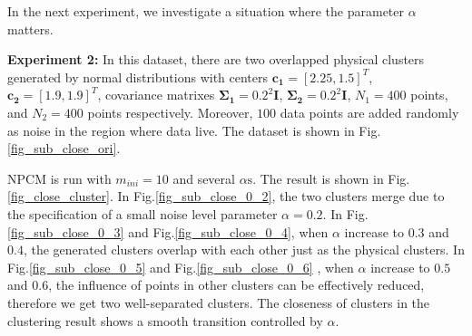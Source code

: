 \documentclass[conference]{IEEEtran}
\theoremstyle{definition}
\begin{document}
In the next experiment, we investigate a situation where the parameter $\alpha$ matters.

\textbf{Experiment 2:} In this dataset, there are two overlapped physical clusters generated by normal distributions with centers $\mathbf{c_1}=[2.25, 1.5]^T$, $\mathbf{c_2}=[1.9, 1.9]^T$, covariance matrixes $\mathbf{\Sigma_1}=0.2^2\mathbf{I}$, $\mathbf{\Sigma_2}=0.2^2\mathbf{I}$, $N_1=400$ points, and $N_2=400$ points respectively.  Moreover, $100$ data points are added randomly as noise in the region where data live. The dataset is shown in Fig.\ref{fig_sub_close_ori}.

NPCM is run with $m_{ini}=10$ and several $\alpha\text{s}$. The result is shown in Fig.\ref{fig_close_cluster}. In Fig.\ref{fig_sub_close_0_2}, the two clusters merge due to the specification of a small noise level parameter $\alpha=0.2$. In Fig.\ref{fig_sub_close_0_3} and Fig.\ref{fig_sub_close_0_4}, when $\alpha$ increase to $0.3$ and $0.4$, the generated clusters overlap with each other just as the physical clusters. In Fig.\ref{fig_sub_close_0_5} and Fig.\ref{fig_sub_close_0_6} , when $\alpha$ increase to $0.5$ and $0.6$, the influence of points in other clusters can be effectively reduced, therefore we get two well-separated clusters.
The closeness of clusters in the clustering result shows a smooth transition controlled by $\alpha$.
\end{document}
